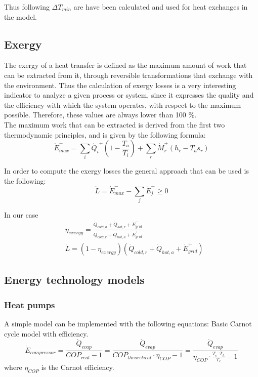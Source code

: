 \documentclass{article}
\begin{document}
Thus following $\Delta T_{min}$ are have been calculated and used for heat exchanges in the model.


\subsection{Exergy}
The exergy of a heat transfer is defined as the maximum amount of work that can be extracted from it, through reversible transformations that exchange with the environment. Thus the calculation of exergy losses is a very interesting indicator to analyze a given process or system, since it expresses the quality and the efficiency with which the system operates, with respect to the maximum possible. Therefore, these values are always lower than 100 \%. \\

The maximum work that can be extracted is derived from the first two thermodynamic principles, and is given by the following formula:
\begin{equation}
    \dot{E}^{-}_{max} = \sum_{i} \dot{Q_i}^{+} (1 - \frac{T_{a}}{T_i} ) + \sum_{r} \dot{M}_{r}^{+} (h_{r} - T_{a} s_{r})    
\end{equation}

In order to compute the exergy losses the general approach that can be used is the following:
\begin{equation}
    \dot{L} = \dot{E}^{-}_{max} - \sum_{j}\dot{E}^{-}_{j} \geq 0
\end{equation}

In our case
\begin{align}
    & \eta_{exergy} =  \frac{\dot{Q}_{cold,a} + \dot{Q}_{hot,r} + \dot{E}_{grid}^{-}}{\dot{Q}_{cold,r} + \dot{Q}_{hot,a} + \dot{E}_{grid}^{+}}  \\
    & \dot{L} = (1-\eta_{exergy})(\dot{Q}_{cold,r} + \dot{Q}_{hot,a} + \dot{E}_{grid}^{+})
\end{align}

\subsection{Energy technology models}

\subsubsection{Heat pumps}\label{ss:hp}
A simple model can be implemented with the following equations:
Basic Carnot cycle model with efficiency.
\begin{equation}
    \dot{E}_{compressor} = \frac{\dot{Q}_{evap}}{COP_{real}-1} = \frac{\dot{Q}_{evap}}{COP_{theoretical} \cdot \eta_{COP} - 1} = \frac{\dot{Q}_{evap}}{\eta_{COP} \cdot \frac{T_{c} – T_{h}}{T_{c}} -1} 
\end{equation}
where $\eta_{COP}$ is the Carnot efficiency.\\
\end{document}
